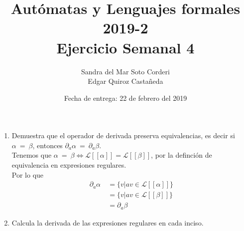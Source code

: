 \documentclass{article}
\begin{document}
    
    \title{Autómatas y Lenguajes formales 2019-2\\
    \large Ejercicio Semanal 4}

    \date{Fecha de entrega: 22 de febrero del 2019}

    \author{Sandra del Mar Soto Corderi\\
    Edgar Quiroz Castañeda}

    \maketitle


    \begin{enumerate}
        \item {
        Demuestra que el operador de derivada preserva equivalencias, es decir si
        $\alpha \ = \ \beta$, entonces $\partial_{a} \alpha \ = \ \partial_{a} \beta$.\\
        Tenemos que $\alpha \ = \ \beta \iff 
        \mathcal{L}[\![\alpha]\!] = \mathcal{L}[\![\beta]\!]$, por la definción
        de equivalencia en expresiones regulares. \\
        Por lo que 
        \begin{align*}
            \partial_{a} \alpha \ &= \{v | av \in \mathcal{L}[\![\alpha]\!]\} \\
                                  &= \{v | av \in \mathcal{L}[\![\beta]\!]\} \\
                                  &= \partial_{a} \beta
        \end{align*}

            
        }
        
        \item{
        Calcula la derivada de las expresiones regulares en cada inciso.\\
		\begin{enumerate}[a)]
		

\end{enumerate}}
\end{enumerate}
\end{document}
